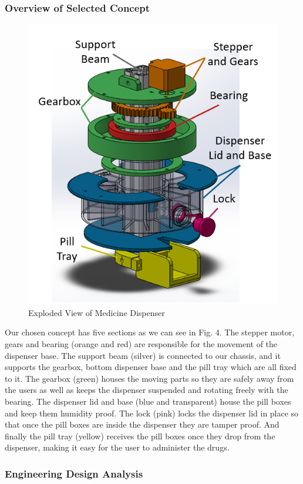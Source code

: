 \documentclass[12pt]{article}
\begin{document}
\subsubsection{Overview of Selected Concept}
\begin{figure}[H]
	\centering
	\includegraphics[width=0.3\linewidth]{M4.png}
	\caption{Exploded View of Medicine Dispenser}
\end{figure}
Our chosen concept has five sections as we can see in Fig. 4. The stepper motor, gears and bearing (orange and red) are responsible for the movement of the dispenser base. The support beam (silver) is connected to our chassis, and it supports the gearbox, bottom dispenser base and the pill tray which are all fixed to it. The gearbox (green) houses the moving parts so they are safely away from the users as well as keeps the dispenser suspended and rotating freely with the bearing. The dispenser lid and base (blue and transparent) house the pill boxes and keep them humidity proof. The lock (pink) locks the dispenser lid in place so that once the pill boxes are inside the dispenser they are tamper proof. And finally the pill tray (yellow) receives the pill boxes once they drop from the dispenser, making it easy for the user to administer the drugs.
\subsubsection{Engineering Design Analysis}
\end{document}

